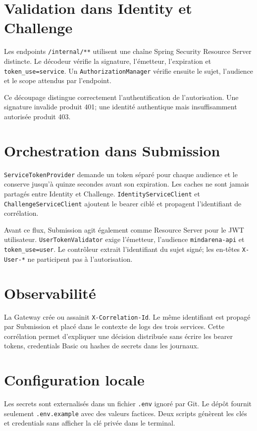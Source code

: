 \documentclass[12pt,a4paper,oneside]{report}
\newcommand{\code}[1]{\texttt{#1}}
\begin{document}
\section{Validation dans Identity et Challenge}
Les endpoints \code{/internal/**} utilisent une chaîne Spring Security Resource
Server distincte. Le décodeur vérifie la signature, l'émetteur, l'expiration et
\code{token\_use=service}. Un \code{AuthorizationManager} vérifie ensuite le sujet,
l'audience et le scope attendus par l'endpoint.

Ce découpage distingue correctement l'authentification de l'autorisation. Une
signature invalide produit 401; une identité authentique mais insuffisamment
autorisée produit 403.

\section{Orchestration dans Submission}
\code{ServiceTokenProvider} demande un token séparé pour chaque audience et le
conserve jusqu'à quinze secondes avant son expiration. Les caches ne sont jamais
partagés entre Identity et Challenge. \code{IdentityServiceClient} et
\code{ChallengeServiceClient} ajoutent le bearer ciblé et propagent l'identifiant
de corrélation.

Avant ce flux, Submission agit également comme Resource Server pour le JWT
utilisateur. \code{UserTokenValidator} exige l'émetteur, l'audience
\code{mindarena-api} et \code{token\_use=user}. Le contrôleur extrait l'identifiant
du sujet signé; les en-têtes \code{X-User-*} ne participent pas à l'autorisation.

\section{Observabilité}
La Gateway crée ou assainit \code{X-Correlation-Id}. Le même identifiant est
propagé par Submission et placé dans le contexte de logs des trois services.
Cette corrélation permet d'expliquer une décision distribuée sans écrire les
bearer tokens, credentials Basic ou hashes de secrets dans les journaux.

\section{Configuration locale}
Les secrets sont externalisés dans un fichier \code{.env} ignoré par Git. Le
dépôt fournit seulement \code{.env.example} avec des valeurs factices. Deux
scripts génèrent les clés et credentials sans afficher la clé privée dans le
terminal.
\end{document}
